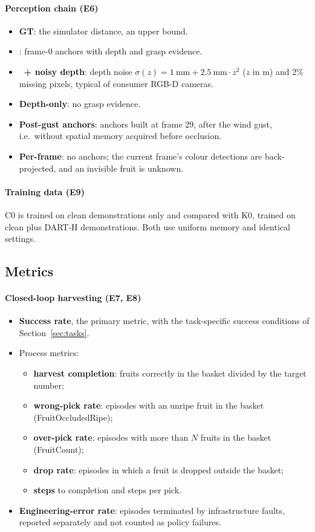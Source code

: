 \paragraph{Perception chain (E6)}
\begin{itemize}
\item \textbf{GT}: the simulator distance, an upper bound.
\item \textbf{\fdm}: frame-0 anchors with depth and grasp evidence.
\item \textbf{\fdm\ + noisy depth}: depth noise $\sigma(z) = 1~\mathrm{mm} + 2.5~\mathrm{mm}\cdot z^2$ ($z$ in m) and 2\% missing pixels, typical of consumer RGB-D cameras.
\item \textbf{Depth-only}: no grasp evidence.
\item \textbf{Post-gust anchors}: anchors built at frame 29, after the wind gust, i.e.\ without spatial memory acquired before occlusion.
\item \textbf{Per-frame}: no anchors; the current frame's colour detections are back-projected, and an invisible fruit is unknown.
\end{itemize}

\paragraph{Training data (E9)} C0 is trained on clean demonstrations only and compared with K0, trained on clean plus DART-H demonstrations. Both use uniform memory and identical settings.

\subsection{Metrics}
\label{sec:metrics}
\paragraph{Closed-loop harvesting (E7, E8)}
\begin{itemize}
\item \textbf{Success rate}, the primary metric, with the task-specific success conditions of Section~\ref{sec:tasks}.
\item Process metrics:
  \begin{itemize}
  \item \textbf{harvest completion}: fruits correctly in the basket divided by the target number;
  \item \textbf{wrong-pick rate}: episodes with an unripe fruit in the basket (FruitOccludedRipe);
  \item \textbf{over-pick rate}: episodes with more than $N$ fruits in the basket (FruitCount);
  \item \textbf{drop rate}: episodes in which a fruit is dropped outside the basket;
  \item \textbf{steps} to completion and steps per pick.
  \end{itemize}
\item \textbf{Engineering-error rate}: episodes terminated by infrastructure faults, reported separately and not counted as policy failures.
\end{itemize}

